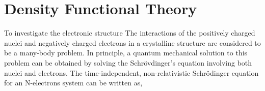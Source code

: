 \section{Density Functional Theory}
\label{Chap:Mech:DFT}

To investigate the electronic structure
The interactions of the positively charged nuclei and negatively charged electrons in a crystalline structure are considered to be a many-body problem. In principle, a quantum mechanical solution to this problem can be obtained by solving the Schr\"{o}vdinger’s equation involving both nuclei and electrons. The time-independent, non-relativistic Schr\"{o}dinger equation for an N-electrons system can be written as,